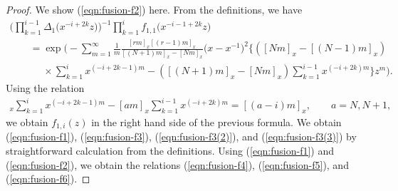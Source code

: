\documentclass[pdftex]{sigma}
\numberwithin{equation}{section}
\begin{document}
\begin{proof}
We show (\ref{eqn:fusion-f2}) here. From the definitions, we have
\begin{gather*}
\Bigg(\prod_{k=1}^{i-1}\Delta_1\big(x^{-i+2k}z\big)\Bigg)^{-1}
\prod_{k=1}^i f_{1,1}\big(x^{-i-1+2k}z\big)
\\ \qquad
{}=\exp\Biggl(-\sum_{m=1}^\infty
\frac{1}{m}\frac{[rm]_x[(r-1)m]_x}{[(N+1)m]_x-[Nm]_x}\big(x-x^{-1}\big)^2
\Biggl\{([Nm]_x-[(N-1)m]_x)
\\ \qquad\phantom{=}
{}\times\sum_{k=1}^i x^{(-i+2k-1)m}-([(N+1)m]_x-[Nm]_x)
\sum_{k=1}^{i-1}x^{(-i+2k)m}\Biggr\}z^m\Biggr).
\end{gather*}
Using the relation
\begin{gather*}
[(a-1)m]_x\sum_{k=1}^i x^{(-i+2k-1)m}-[a m]_x\sum_{k=1}^{i-1}x^{(-i+2k)m}=[(a-i)m]_x,\qquad a=N, N+1,
\end{gather*}
we obtain $f_{1,i}(z)$ in the right hand side of the previous formula.
We obtain (\ref{eqn:fusion-f1}), (\ref{eqn:fusion-f3}), (\ref{eqn:fusion-f3(2)}), and (\ref{eqn:fusion-f3(3)})
by straightforward calculation from the definitions.
Using (\ref{eqn:fusion-f1}) and (\ref{eqn:fusion-f2}),
we obtain the relations (\ref{eqn:fusion-f4}), (\ref{eqn:fusion-f5}), and (\ref{eqn:fusion-f6}).
\end{proof}
\end{document}
